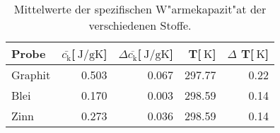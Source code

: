 
\begin{table}[!h]
\begin{center}
\begin{tabular}{|l|r|r|r|r|}
\hline
Probe & $\bar{c_\mathrm{k}}$[$\SI{}{\joule\per\gram\kelvin}$] & $\Delta\overline{c_\mathrm{k}}$[$\SI{}{\joule\per\gram\kelvin}$] & T[$\SI{}{\kelvin}$] & $\Delta$ T[$\SI{}{\kelvin}$] \\
\hline
\hline
Graphit & 0.503 & 0.067 & 297.77 & 0.22\\
Blei    & 0.170 & 0.003 & 298.59 & 0.14\\
Zinn    & 0.273 & 0.036 & 298.59 & 0.14\\
\hline
\end{tabular}
\caption[]{Mittelwerte der spezifischen W"armekapazit"at der verschiedenen Stoffe.}
\label{mittel}
\end{center}
\end{table}